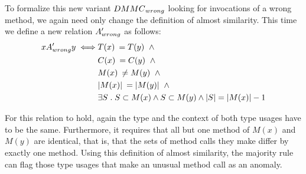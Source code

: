 To formalize this new variant $\mathnormal{DMMC}_{\mathnormal{wrong}}$ looking for invocations of a wrong method, we again need only change the definition of almost similarity.
This time we define a new relation $A'_{\mathnormal{wrong}}$ as follows:
\begin{align*}
xA'_{\mathnormal{wrong}}y \iff & T(x) \: = T(y) \;\; \land \\
                                & C(x) \: = C(y) \;\; \land \\
                                & M(x) \: \neq M(y) \;\; \land \\
                                & |M(x)| \:  = |M(y)| \;\; \land \\
                                & \exists S \; . \; S \subset M(x) \land S \subset M(y) \land |S| = |M(x)| - 1
\end{align*}

For this relation to hold, again the type and the context of both type usages have to be the same.
Furthermore, it requires that all but one method of $M(x)$ and $M(y)$ are identical, that is, that the sets of method calls they make differ by exactly one method.
Using this definition of almost similarity, the majority rule can flag those type usages that make an unusual method call as an anomaly.



